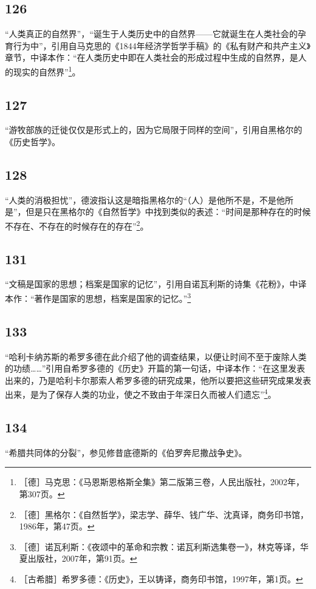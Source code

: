 \documentclass[fontset=fandol, a4paper, 12pt, openright]{ctexbook}
\begin{document}
\subsection*{126}
“人类真正的自然界”，“诞生于人类历史中的自然界——它就诞生在人类社会的孕育行为中”，引用自马克思的《1844年经济学哲学手稿》的《私有财产和共产主义》章节，中译本作：“在人类历史中即在人类社会的形成过程中生成的自然界，是人的现实的自然界”\footnote{［德］马克思：《马恩斯恩格斯全集》第二版第三卷，人民出版社，2002年，第307页。}。

\subsection*{127}
“游牧部族的迁徙仅仅是形式上的，因为它局限于同样的空间”，引用自黑格尔的《历史哲学》。

\subsection*{128}
“人类的消极担忧”，德波指认这是暗指黑格尔的“（人）是他所不是，不是他所是”，但是只在黑格尔的《自然哲学》中找到类似的表述：“时间是那种存在的时候不存在、不存在的时候存在的存在”\footnote{［德］黑格尔：《自然哲学》，梁志学、薛华、钱广华、沈真译，商务印书馆，1986年，第47页。}。

\subsection*{131}
“文稿是国家的思想；档案是国家的记忆”，引用自诺瓦利斯的诗集《花粉》，中译本作：“著作是国家的思想，档案是国家的记忆。”\footnote{［德］诺瓦利斯：《夜颂中的革命和宗教：诺瓦利斯选集卷一》，林克等译，华夏出版社，2007年，第91页。}

\subsection*{133}
“哈利卡纳苏斯的希罗多德在此介绍了他的调查结果，以便让时间不至于废除人类的功绩……”引用自希罗多德的《历史》开篇的第一句话，中译本作：“在这里发表出来的，乃是哈利卡尔那索人希罗多德的研究成果，他所以要把这些研究成果发表出来，是为了保存人类的功业，使之不致由于年深日久而被人们遗忘”\footnote{［古希腊］希罗多德：《历史》，王以铸译，商务印书馆，1997年，第1页。}。

\subsection*{134}
“希腊共同体的分裂”，参见修昔底德斯的《伯罗奔尼撒战争史》。
\end{document}
